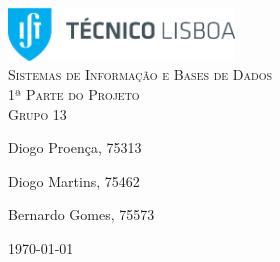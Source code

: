 \begin{titlepage}

	\begin{center}

		\includegraphics[width=6cm]{./title}\\[3cm]

		\textsc{\LARGE Sistemas de Informação e Bases de Dados}\\[1.5cm]

		\textsc{\Large 1ª Parte do Projeto}\\[1.5cm]
		
		\textsc{\Large Grupo 13}\\[1.5cm]


		


		\noindent
		\begin{minipage}{0.4\textwidth}
			\begin{flushleft} \large
				Diogo Proença, 75313
			\end{flushleft}
		\end{minipage}
		\begin{minipage}{0.4\textwidth}
			\begin{flushright} \large
				Diogo Martins, 75462
			\end{flushright}
		\end{minipage}
		
		\begin{minipage}{0.4\textwidth}
			\begin{flushright} \large
				Bernardo Gomes, 75573	
			\end{flushright}
		\end{minipage}

		\vfill

		{\large \today}


	\end{center}

\end{titlepage}